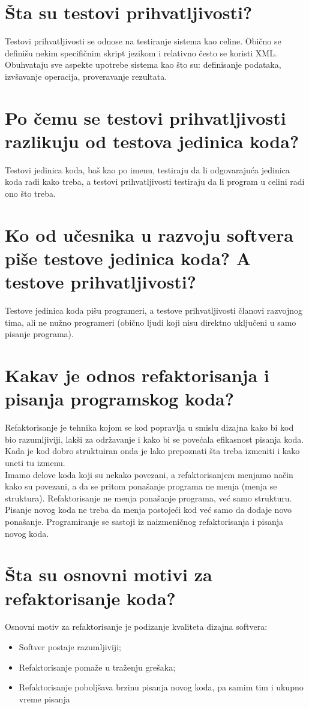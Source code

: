 \documentclass[a4paper]{article}
\begin{document}
\section{Šta su testovi prihvatljivosti?}
  Testovi prihvatljivosti se odnose na testiranje sistema kao celine. Obično se definišu 
  nekim specifičnim skript jezikom i relativno često se koristi XML. Obuhvataju sve aspekte 
  upotrebe sistema kao što su: definisanje podataka, izvšavanje operacija, proveravanje 
  rezultata.

\section{Po čemu se testovi prihvatljivosti razlikuju od testova jedinica koda?}
  Testovi jedinica koda, baš kao po imenu, testiraju da li odgovarajuća jedinica koda 
  radi kako treba, a testovi prihvatljivosti testiraju da li program u celini radi ono
  što treba.

\section{Ko od učesnika u razvoju softvera piše testove jedinica koda? A testove prihvatljivosti?}
  Testove jedinica koda pišu programeri, a testove prihvatljivosti članovi razvojnog tima,
  ali ne nužno programeri (obično ljudi koji nisu direktno uključeni u samo pisanje programa).

\section{Kakav je odnos refaktorisanja i pisanja programskog koda?}
  Refaktorisanje je tehnika kojom se kod popravlja u smislu dizajna kako bi kod bio razumljiviji, 
  lakši za održavanje i kako bi se povećala efikasnost pisanja koda. 
  Kada je kod dobro struktuiran onda je lako prepoznati šta treba izmeniti i kako
  uneti tu izmenu. \\
  \indent Imamo delove koda koji su nekako povezani, a refaktorisanjem menjamo način kako su povezani,
  a da se pritom ponašanje programa ne menja (menja se struktura). Refaktorisanje ne menja
  ponašanje programa, već samo strukturu.\\
  \indent Pisanje novog koda ne treba da menja postojeći kod već samo da dodaje novo ponašanje. 
  Programiranje se sastoji iz naizmeničnog refaktorisanja i pisanja novog koda.

\section{Šta su osnovni motivi za refaktorisanje koda?}
  \noindent Osnovni motiv za refaktorisanje je podizanje kvaliteta dizajna softvera:
  \begin{itemize}
    \item Softver postaje razumljiviji;
    \item Refaktorisanje pomaže u traženju grešaka;
    \item Refaktorisanje poboljšava brzinu pisanja novog koda, pa samim tim i ukupno vreme pisanja
  \end{itemize}
\end{document}
